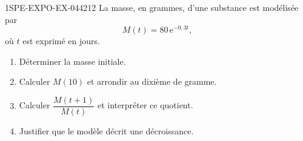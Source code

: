 \begin{exercice}{1SPE-EXPO-EX-044}{2}{12}
La masse, en grammes, d'une substance est modélisée par
\[M(t)=80\,\mathrm{e}^{-0{,}3t},\]
où $t$ est exprimé en jours.

\begin{enumerate}
\item Déterminer la masse initiale.
\item Calculer $M(10)$ et arrondir au dixième de gramme.
\item Calculer $\dfrac{M(t+1)}{M(t)}$ et interpréter ce quotient.
\item Justifier que le modèle décrit une décroissance.
\end{enumerate}
\end{exercice}

